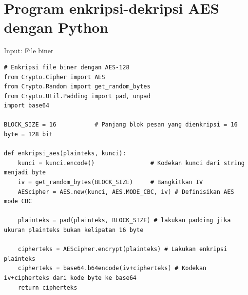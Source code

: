 \documentclass{article}
\begin{document}

\section*{Program enkripsi-dekripsi AES dengan Python}
Input: File biner

\vspace{10mm}

\begin{verbatim}
# Enkripsi file biner dengan AES-128
from Crypto.Cipher import AES
from Crypto.Random import get_random_bytes
from Crypto.Util.Padding import pad, unpad
import base64

BLOCK_SIZE = 16           # Panjang blok pesan yang dienkripsi = 16 byte = 128 bit

def enkripsi_aes(plainteks, kunci):
    kunci = kunci.encode()                # Kodekan kunci dari string menjadi byte
    iv = get_random_bytes(BLOCK_SIZE)     # Bangkitkan IV
    AEScipher = AES.new(kunci, AES.MODE_CBC, iv) # Definisikan AES mode CBC

    plainteks = pad(plainteks, BLOCK_SIZE) # lakukan padding jika ukuran plainteks bukan kelipatan 16 byte

    cipherteks = AEScipher.encrypt(plainteks) # Lakukan enkripsi plainteks
    cipherteks = base64.b64encode(iv+cipherteks) # Kodekan iv+cipherteks dari kode byte ke base64
    return cipherteks
\end{verbatim}
\end{document}
